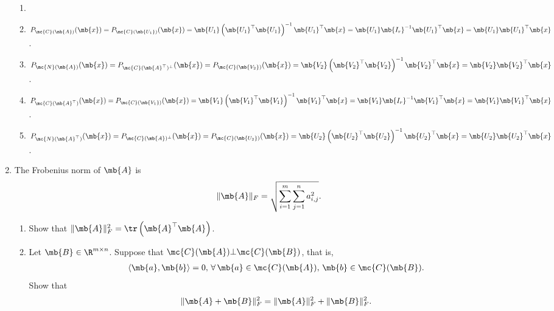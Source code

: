 \begin{exercise}
\begin{enumerate}
            \begin{solution}
                \begin{enumerate}
                    \item []
                    \item $P_{\mc{C}(\mb{A})}(\mb{x}) = P_{\mc{C}(\mb{U_1})}(\mb{x}) = \mb{U_1}\left(\mb{U_1}^\top\mb{U_1}\right)^{-1}\mb{U_1}^\top\mb{x} = \mb{U_1}\mb{I_r}^{-1}\mb{U_1}^\top\mb{x} = \mb{U_1}\mb{U_1}^\top\mb{x}$.
                    \item $P_{\mc{N}(\mb{A})}(\mb{x}) = P_{\mc{C}(\mb{A}^\top)^\perp}(\mb{x}) = P_{\mc{C}(\mb{V_2})}(\mb{x}) = \mb{V_2}\left(\mb{V_2}^\top\mb{V_2}\right)^{-1}\mb{V_2}^\top\mb{x} = \mb{V_2}\mb{V_2}^\top\mb{x}$.
                    \item $P_{\mc{C}(\mb{A}^\top)}(\mb{x}) = P_{\mc{C}(\mb{V_1})}(\mb{x}) = \mb{V_1}\left(\mb{V_1}^\top\mb{V_1}\right)^{-1}\mb{V_1}^\top\mb{x} = \mb{V_1}\mb{I_r}^{-1}\mb{V_1}^\top\mb{x} = \mb{V_1}\mb{V_1}^\top\mb{x}$.
                    \item $P_{\mc{N}(\mb{A}^\top)}(\mb{x}) = P_{\mc{C}(\mb{A})^\perp}(\mb{x}) = P_{\mc{C}(\mb{U_2})}(\mb{x}) = \mb{U_2}\left(\mb{U_2}^\top\mb{U_2}\right)^{-1}\mb{U_2}^\top\mb{x} = \mb{U_2}\mb{U_2}^\top\mb{x}$.
                        \qedhere
                \end{enumerate}
            \end{solution}

        \item The Frobenius norm of $\mb{A}$ is
            \begin{align*}
                \|\mb{A}\|_F=\sqrt{\sum_{i=1}^m\sum_{j=1}^na_{i,j}^2}.
            \end{align*}
            \begin{enumerate}
                \item Show that $\|\mb{A}\|_F^2=\tr \left(\mb{A}^{\top}\mb{A}\right)$.

                \item Let $\mb{B}\in\R^{m\times n}$. Suppose that $\mc{C}(\mb{A})\bot\mc{C}(\mb{B})$, that is,
                    \begin{align*}
                        \langle\mb{a},\mb{b}\rangle=0,\,\forall\,\mb{a}\in\mc{C}(\mb{A}),\,\mb{b}\in\mc{C}(\mb{B}).
                    \end{align*}
                    Show that
                    \begin{align*}
                        \|\mb{A}+\mb{B}\|_F^2=\|\mb{A}\|_F^2+\|\mb{B}\|_F^2.
                    \end{align*}
            \end{enumerate}


\end{enumerate}
\end{exercise}
